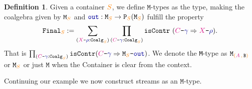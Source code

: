 \documentclass[twoside,11pt,openright]{report}
\theoremstyle{plain} %
\theoremstyle{definition}
\newtheorem{defn}[thm]{Definition}%
\theoremstyle{remark}
\newcommand*{\type}[1]{\textcolor{magenta!90!black}{#1}}
\newcommand*{\container}[1]{\textcolor{orange}{#1}}
\newcommand*{\containerpair}[2]{\ensuremath{\colorlet{savedleftcolor}{.}\color{orange}\left(\color{savedleftcolor}#1\,\textcolor{orange}{\mathbf{,}}\,#2\color{orange}\right)\color{savedleftcolor}}}
\newcommand*{\coalg}[2]{#1\texttt{-}#2}
\newcommand*{\function}[1]{\textcolor{blue!60!black}{\ensuremath{\mathtt{#1}}}}
\newcommand*{\typeformer}[1]{\ensuremath{\mathtt{#1}}}
\newcommand*{\functor}[1]{\ensuremath{\mathbf{\mathtt{#1}}}}
\begin{document}
\begin{defn}
  Given a container \(\container{S}\), we define \(\mathtt{M}\)-types as the type, making the coalgebra given by \(\typeformer{M}_{\container{S}}\) and \(\function{out} : \typeformer{M}_{\container{S}} \rightarrow \functor{P}_{\container{S}}(\typeformer{M}_{\container{S}})\) fulfill the property
  \begin{equation}
    \typeformer{Final}_{\container{S}} := \sum_{(\coalg{\type{X}}{\function{\rho}} : \mathtt{Coalg}_{\container{S}})} \prod_{(\coalg{\type{C}}{\function{\gamma}} : \mathtt{Coalg}_{\container{S}})} \mathtt{isContr}~(\coalg{\type{C}}{\function{\gamma}} \Rightarrow \coalg{\type{X}}{\function{\rho}}).
  \end{equation}
  That is \(\prod_{(\coalg{\type{C}}{\function{\gamma}} : \mathtt{Coalg}_{\container{S}})} \mathtt{isContr}(\coalg{\type{C}}{\function{\gamma}} \Rightarrow \coalg{\typeformer{M}_{\container{S}}}{\function{out}})\). We denote the \texttt{M}-type as \(\typeformer{M}_{\containerpair{\type{A}}{\typeformer{B}}}\) or \(\typeformer{M}_{\container{S}}\) or just \(\typeformer{M}\) when the Container is clear from the context.
\end{defn}
\noindent Continuing our example we now construct streams as an \(\mathtt{M}\)-type.
\end{document}
